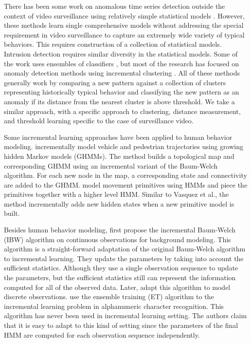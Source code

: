 There has been some work on anomalous time series detection outside
the context of video surveillance using relatively simple statistical
models .  However, these
methods learn single comprehensive models without addressing the
special requirement in video surveillance to capture an extremely wide
variety of typical behaviors.  This requires construction of a
collection of statistical models.  Intrusion detection requires
similar diversity in the statistical models.  Some of the work uses
ensembles of classifiers , but
most of the research has focused on anomaly detection methods using
incremental
clustering .
All of these methods generally work by comparing a new pattern against
a collection of clusters representing historically typical behavior
and classifying the new pattern as an anomaly if its distance from the
nearest cluster is above threshold.  We take a similar approach, with
a specific approach to clustering, distance measurement, and threshold
learning specific to the case of surveillance video.

Some incremental learning approaches have been applied to human
behavior modeling.  incrementally
model vehicle and pedestrian trajectories using growing hidden Markov
models (GHMMs). The method builds a topological map and corresponding
GHMM using an incremental variant of the Baum-Welch algorithm. For
each new node in the map, a corresponding state and connectivity are
added to the GHMM.  model movement
primitives using HMMs and piece the primitives together with a higher
level HMM. Similar to Vasquez et al., the method incrementally adds
new hidden states when a new primitive model is built.

Besides human behavior modeling,  first
propose the incremental Baum-Welch (IBW) algorithm on continuous
observations for background modeling. This algorithm is a
straight-forward adaptation of the original Baum-Welch algorithm to
incremental learning. They update the parameters by taking into
account the sufficient statistics. Although they use a single
observation sequence to update the parameters, but the sufficient
statistics still can represent the information computed for all of the
observed data. Later,  adapt this
algorithm to model discrete
observations.  use the ensemble
training (ET) algorithm  to the incremental
learning problem in alphanumeric character recognition. This algorithm
has never been used in incremental learning setting. The authors claim
that it is easy to adapt to this kind of setting since the parameters
of the final HMM are computed for each observation sequence
independently.

